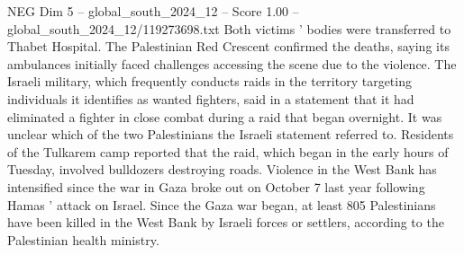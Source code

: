 \begin{textsample}{NEG Dim 5 – global\_south\_2024\_12 – Score 1.00 – global\_south\_2024\_12/119273698.txt}
Both victims ' bodies were transferred to Thabet Hospital.
The Palestinian Red Crescent confirmed the deaths, saying its ambulances initially faced challenges accessing the scene due to the violence.
The Israeli military, which frequently conducts raids in the territory targeting individuals it identifies as wanted fighters, said in a statement that it had eliminated a fighter in close combat during a raid that began overnight.
It was unclear which of the two Palestinians the Israeli statement referred to.
Residents of the Tulkarem camp reported that the raid, which began in the early hours of Tuesday, involved bulldozers destroying roads.
Violence in the West Bank has intensified since the war in Gaza broke out on October 7 last year following Hamas ' attack on Israel.
Since the Gaza war began, at least 805 Palestinians have been killed in the West Bank by Israeli forces or settlers, according to the Palestinian health ministry.

\end{textsample}
